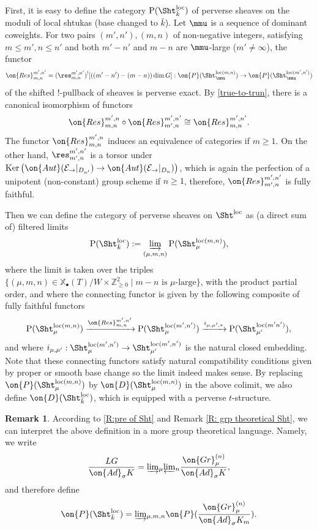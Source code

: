 \documentclass[11pt]{amsart}
\theoremstyle{definition}
\theoremstyle{definition}
\newtheorem{rmk}[thm]{Remark}
\theoremstyle{definition}
\numberwithin{equation}{subsection}
\DeclareMathOperator{\Ker}{Ker}
\def\ZZ{\mathbb{Z}}
\def\calE{\mathcal{E}}
\newcommand{\Ad}{{\on{Ad}}}
\newcommand{\Aut}{{\on{Aut}}}
\newcommand{\Gr}{{\on{Gr}}}
\newcommand{\Res}{{\on{Res}}}
\newcommand{\loc}{\mathrm{loc}}
\def\xcoch{\mathbb{X}_\bullet}
\newcommand{\rightone}{\to}
\begin{document}
First, it is easy to define 
the category $\mathrm{P}(\Sht_{\bar k}^\loc)$ of perverse sheaves on the moduli of local shtukas (base changed to $\bar k$). 
Let $\mmu$ is a sequence of dominant coweights. For two pairs $(m',n'), (m,n)$ of non-negative integers, satisfying $m \leq m', n\leq n'$ and both $m'-n'$ and $m-n$ are $\mmu$-large ($m'\neq \infty$), the functor
$$\Res^{m',n'}_{m,n}=(\res^{m',n'}_{m,n})^![((m'-n')-(m-n))\dim G]:\on{P}(\Sht^{\loc(m,n)}_{\mmu})\to \on{P}(\Sht^{\loc(m',n')}_{\mmu})$$ 
of the shifted $!$-pullback of sheaves is perverse exact. By \eqref{true-to-trun}, there is a canonical isomorphism of functors
\[\Res^{m',n}_{m,n}\circ\Res^{m',n'}_{m',n}\cong \Res^{m',n'}_{m,n}.\]
The functor $\Res^{m',n}_{m,n}$ induces an equivalence of categories if $m\geq 1$. On the other hand, $\res^{m',n'}_{m',n}$ is a torsor under $\Ker\big( \Aut(\calE_\rightone|_{D_{n'}}) \to \Aut(\calE_\rightone|_{D_{n}}) \big)$, which is again the perfection of a unipotent (non-constant) group scheme if $n\geq 1$, therefore, $\Res^{m',n'}_{m',n}$ is fully faithful.

Then we can define the category of perverse sheaves on $\Sht^\loc$  as (a direct sum of) filtered limits
\begin{equation}
\label{E:definition of P(Sloc)}
\mathrm{P}(\Sht_{\bar k}^\loc): =\varinjlim_{(\mu, m,n)} \mathrm{P}(\Sht_\mu^{\loc(m, n)}),
\end{equation}
where the limit is taken over the triples $\{(\mu, m, n) \in \xcoch(T)/W \times \ZZ^2_{\geq 0} \mid m-n \mbox{ is }\mu\mbox{-large}\}$, with the product partial order, and 
where the connecting functor is given by the following composite of fully faithful functors
\[
\mathrm{P}(\Sht_{\mu}^{\loc(m, n)}) 
\xrightarrow{\Res^{m',n'}_{m,n}}
\mathrm{P}(\Sht_{\mu}^{\loc(m', n')})
\xrightarrow{i_{\mu,\mu',*}}
\mathrm{P}(\Sht_{\mu'}^{\loc(m' n')}), 
\]
and where $i_{\mu, \mu'}: \Sht_{\mu}^{\loc(m', n')} \to \Sht_{\mu'}^{\loc(m', n')}$ is the natural closed embedding. 
Note that these connecting functors satisfy natural compatibility conditions given by proper or smooth base change so the limit indeed makes sense.
By replacing $\on{P}(\Sht_{\mu}^{\loc(m, n)})$ by $\on{D}(\Sht_{\mu}^{\loc(m, n)})$ in the above colimit, we also define $\on{D}(\Sht_{\bar k}^\loc)$, which is equipped with a perverse $t$-structure.

\begin{rmk}
\label{R: sheaves on Shtloc}
According to \eqref{R:pre of Sht} and Remark \ref{R: grp theoretical Sht}, we can interpret the above definition in a more group theoretical language. Namely, we write
\[\frac{LG}{\Ad_\sigma K}=\underrightarrow\lim_{\mu}\underleftarrow\lim_n \frac{\Gr_\mu^{(n)}}{\Ad_\sigma K},\]
and therefore define
\[\on{P}(\Sht^\loc_{\bar k})=\underrightarrow\lim_{\mu,m,n}\on{P}(\frac{\Gr^{(n)}_\mu}{\Ad_\sigma K_m}).\]
\end{rmk}
\end{document}
